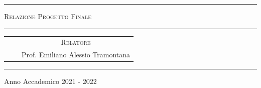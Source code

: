 \begin{titlepage}
\bigskip

\bigskip

\bigskip

\bigskip

\bigskip

\bigskip

\begin{minipage}[b]{8 cm}
	\hrule
	
	\bigskip
	
	{\centering \scshape Relazione Progetto Finale\par}
	
	\bigskip
	
	\hrule
\end{minipage}

\bigskip

\bigskip

\bigskip

\bigskip

\bigskip

\bigskip

\begin{tabular}[t]{ccc}
	
	\textsc{} & \hspace{8cm} &\textsc{Relatore}\\
	& \hspace{8cm} & Prof. Emiliano Alessio Tramontana\\
	
\end{tabular}

\bigskip

\bigskip


%	
%	

\bigskip

\bigskip

\bigskip

\bigskip

\bigskip

\bigskip

\bigskip

\bigskip

\bigskip

\bigskip

\bigskip

\bigskip

\hrule

\bigskip

{
	Anno Accademico 2021 - 2022\par
}
\end{titlepage}
